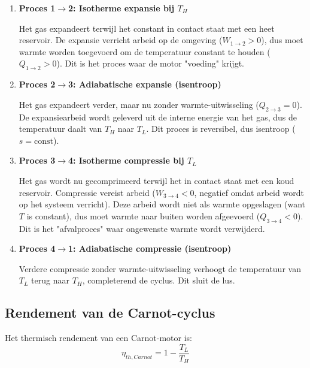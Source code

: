 \documentclass[a4paper,11pt,twoside]{report}
\begin{document}
\begin{enumerate}
    \item \textbf{Proces 1$\to$2: Isotherme expansie bij $T_H$} 
    
    Het gas expandeert terwijl het constant in contact staat met een heet reservoir.
     De expansie verricht arbeid op de omgeving ($W_{1\to2} > 0$), dus moet warmte worden toegevoerd om de temperatuur constant te houden ($Q_{1\to2} > 0$). Dit is het proces waar de motor "voeding" krijgt.
    
    \item \textbf{Proces 2$\to$3: Adiabatische expansie (isentroop)}
    
    Het gas expandeert verder, 
    maar nu zonder warmte-uitwisseling ($Q_{2\to3} = 0$).
     De expansiearbeid wordt geleverd uit de interne energie van het gas, 
     dus de temperatuur daalt van $T_H$ naar $T_L$.
      Dit proces is reversibel, dus isentroop ($s = \text{const}$).
    
    \item \textbf{Proces 3$\to$4: Isotherme compressie bij $T_L$}
    
    Het gas wordt nu gecomprimeerd terwijl het in contact staat met een koud reservoir. 
    Compressie vereist arbeid ($W_{3\to4} < 0$, 
    negatief omdat arbeid wordt op het systeem verricht). 
    Deze arbeid wordt niet als warmte opgeslagen (want $T$ is constant), 
    dus moet warmte naar buiten worden afgeevoerd ($Q_{3\to4} < 0$). 
    Dit is het "afvalproces" waar ongewenste warmte wordt verwijderd.
    
    \item \textbf{Proces 4$\to$1: Adiabatische compressie (isentroop)}
    
    Verdere compressie zonder warmte-uitwisseling verhoogt de temperatuur van $T_L$ terug naar $T_H$, 
    completerend de cyclus. 
    Dit sluit de lus.
\end{enumerate}

\subsection*{Rendement van de Carnot-cyclus}

Het thermisch rendement van een Carnot-motor is:
\[
\eta_{th, Carnot} = 1 - \frac{T_L}{T_H}
\]
\end{document}
